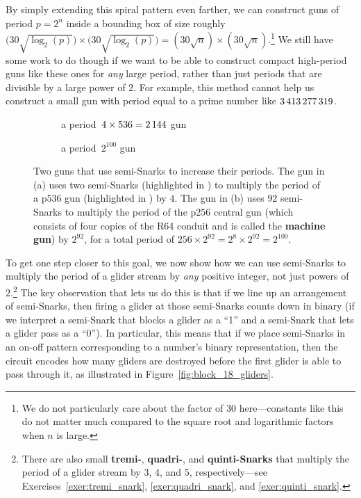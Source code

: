 By simply extending this spiral pattern even farther, we can construct guns of period $p = 2^n$ inside a bounding box of size roughly $\big(30\sqrt{\log_2(p)}\big) \times \big(30\sqrt{\log_2(p)}\big) = (30\sqrt{n}) \times (30\sqrt{n})$.\footnote{We do not particularly care about the factor of $30$ here---constants like this do not matter much compared to the square root and logarithmic factors when $n$ is large.} We still have some work to do though if we want to be able to construct compact high-period guns like these ones for \emph{any} large period, rather than just periods that are divisible by a large power of $2$. For example, this method cannot help us construct a small gun with period equal to a prime number like $3{\,}413{\,}277{\,}319$.

\begin{figure}[!htb]
	\centering
	\begin{subfigure}{0.415\textwidth}
		\centering\vspace*{1.73cm}
		\caption{a period~$4 \times 536 = 2{\,}144$ gun}
		\label{fig:p2144_gun}
	\end{subfigure} \hfill %
	\begin{subfigure}{0.555\textwidth}
		\centering
		\caption{a period~$2^{100}$ gun}
		\label{fig:p_2_100_gun}
	\end{subfigure}
	\caption{Two guns that use semi-Snarks to increase their periods. The gun in (a) uses two semi-Snarks (highlighted in ) to multiply the period of a p$536$ gun (highlighted in ) by $4$. The gun in (b) uses $92$ semi-Snarks to multiply the period of the p$256$ central gun (which consists of four copies of the R64 conduit and is called the \textbf{machine gun}) by $2^{92}$, for a total period of $256 \times 2^{92} = 2^8 \times 2^{92} = 2^{100}$.}
	\label{fig:semi_snark_compact_guns}
\end{figure}

To get one step closer to this goal, we now show how we can use semi-Snarks to multiply the period of a glider stream by \emph{any} positive integer, not just powers of $2$.\footnote{There are also small \textbf{tremi-}, \textbf{quadri-}, and \textbf{quinti-Snarks} that multiply the period of a glider stream by $3$, $4$, and $5$, respectively---see Exercises~\ref{exer:tremi_snark}, \ref{exer:quadri_snark}, and \ref{exer:quinti_snark}.} The key observation that lets us do this is that if we line up an arrangement of semi-Snarks, then firing a glider at those semi-Snarks counts down in binary (if we interpret a semi-Snark that blocks a glider as a ``1'' and a semi-Snark that lets a glider pass as a ``0''). In particular, this means that if we place semi-Snarks in an on-off pattern corresponding to a number's binary representation, then the circuit encodes how many gliders are destroyed before the first glider is able to pass through it, as illustrated in Figure~\ref{fig:block_18_gliders}.

